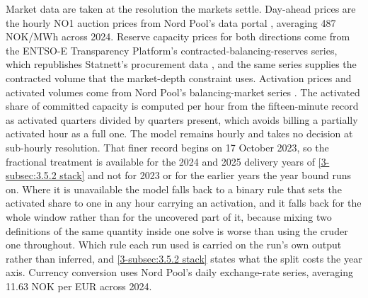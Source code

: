 Market data are taken at the resolution the markets settle. Day-ahead prices are the hourly NO1 auction prices from Nord Pool's data portal \cite{nord_pool_nord_nodate}, averaging 487 NOK/MWh across 2024. Reserve capacity prices for both directions come from the ENTSO-E Transparency Platform's contracted-balancing-reserves series, which republishes Statnett's procurement data \cite{entsoe_entsoe_nodate}, and the same series supplies the contracted volume that the market-depth constraint uses. Activation prices and activated volumes come from Nord Pool's balancing-market series \cite{nord_pool_nord_nodate}. The activated share of committed capacity is computed per hour from the fifteen-minute record as activated quarters divided by quarters present, which avoids billing a partially activated hour as a full one. The model remains hourly and takes no decision at sub-hourly resolution. That finer record begins on 17 October 2023, so the fractional treatment is available for the 2024 and 2025 delivery years of \autoref{3-subsec:3.5.2 stack} and not for 2023 or for the earlier years the year bound runs on. Where it is unavailable the model falls back to a binary rule that sets the activated share to one in any hour carrying an activation, and it falls back for the whole window rather than for the uncovered part of it, because mixing two definitions of the same quantity inside one solve is worse than using the cruder one throughout. Which rule each run used is carried on the run's own output rather than inferred, and \autoref{3-subsec:3.5.2 stack} states what the split costs the year axis. Currency conversion uses Nord Pool's daily exchange-rate series, averaging 11.63 NOK per EUR across 2024.

